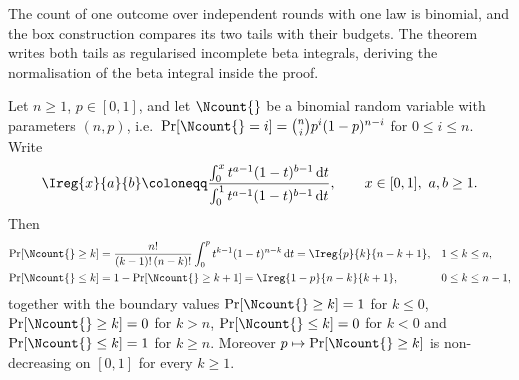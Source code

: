 
The count of one outcome over independent rounds with one law is binomial,
and the box construction compares its two tails with their budgets. The
theorem writes both tails as regularised incomplete beta integrals, deriving
the normalisation of the beta integral inside the proof.

\begin{theorem}\label{thm:binomial-tails}
Let $n\ge1$, $p\in[0,1]$, and let $\Ncount{}$ be a binomial random variable
with parameters $(n,p)$, i.e.\
$\Pr[\Ncount{}=i]=\binom{n}{i}p^{i}(1-p)^{n-i}$ for $0\le i\le n$. Write
\begin{equation}\label{eq:ireg}
  \Ireg{x}{a}{b}\coloneqq
  \frac{\int_0^{x}t^{a-1}(1-t)^{b-1}\,\mathrm{d}t}
       {\int_0^{1}t^{a-1}(1-t)^{b-1}\,\mathrm{d}t},
  \qquad x\in[0,1],\ a,b\ge1 .
\end{equation}
Then
\begin{align}
  \Pr[\Ncount{}\ge k]&=\frac{n!}{(k-1)!\,(n-k)!}
    \int_0^{p}t^{k-1}(1-t)^{n-k}\,\mathrm{d}t
    =\Ireg{p}{k}{n-k+1}, &&1\le k\le n,
    \label{eq:uppertail}\\
  \Pr[\Ncount{}\le k]&=1-\Pr[\Ncount{}\ge k+1]
    =\Ireg{1-p}{n-k}{k+1}, &&0\le k\le n-1,
    \label{eq:lowertail}
\end{align}
together with the boundary values $\Pr[\Ncount{}\ge k]=1$ for $k\le0$,
$\Pr[\Ncount{}\ge k]=0$ for $k>n$, $\Pr[\Ncount{}\le k]=0$ for $k<0$ and
$\Pr[\Ncount{}\le k]=1$ for $k\ge n$. Moreover $p\mapsto\Pr[\Ncount{}\ge k]$
is non-decreasing on $[0,1]$ for every $k\ge1$.
\end{theorem}

